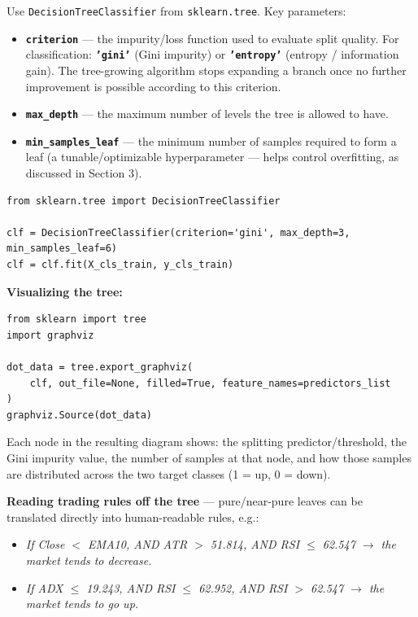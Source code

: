 \documentclass[12pt,openany]{book}
\begin{document}
Use \texttt{DecisionTreeClassifier} from \texttt{sklearn.tree}. Key parameters:

\begin{itemize}[leftmargin=*]
    \item \textbf{\texttt{criterion}} --- the impurity/loss function used to evaluate split quality. For classification: \textbf{\texttt{'gini'}} (Gini impurity) or \textbf{\texttt{'entropy'}} (entropy / information gain). The tree-growing algorithm stops expanding a branch once no further improvement is possible according to this criterion.
    \item \textbf{\texttt{max\_depth}} --- the maximum number of levels the tree is allowed to have.
    \item \textbf{\texttt{min\_samples\_leaf}} --- the minimum number of samples required to form a leaf (a tunable/optimizable hyperparameter --- helps control overfitting, as discussed in Section 3).
\end{itemize}


\begin{Verbatim}[breaklines=true,fontsize=\small]
from sklearn.tree import DecisionTreeClassifier

clf = DecisionTreeClassifier(criterion='gini', max_depth=3, min_samples_leaf=6)
clf = clf.fit(X_cls_train, y_cls_train)
\end{Verbatim}


\textbf{Visualizing the tree:}

\begin{Verbatim}[breaklines=true,fontsize=\small]
from sklearn import tree
import graphviz

dot_data = tree.export_graphviz(
    clf, out_file=None, filled=True, feature_names=predictors_list
)
graphviz.Source(dot_data)
\end{Verbatim}


Each node in the resulting diagram shows: the splitting predictor/threshold, the Gini impurity value, the number of samples at that node, and how those samples are distributed across the two target classes (1 = up, 0 = down).

\textbf{Reading trading rules off the tree} --- pure/near-pure leaves can be translated directly into human-readable rules, e.g.:
\begin{itemize}[leftmargin=*]
    \item \textit{If Close \(<\) EMA10, AND ATR \(>\) 51.814, AND RSI \(\leq\) 62.547 \(\rightarrow\) the market tends to decrease.}
    \item \textit{If ADX \(\leq\) 19.243, AND RSI \(\leq\) 62.952, AND RSI \(>\) 62.547 \(\rightarrow\) the market tends to go up.}

\end{itemize}
\end{document}
